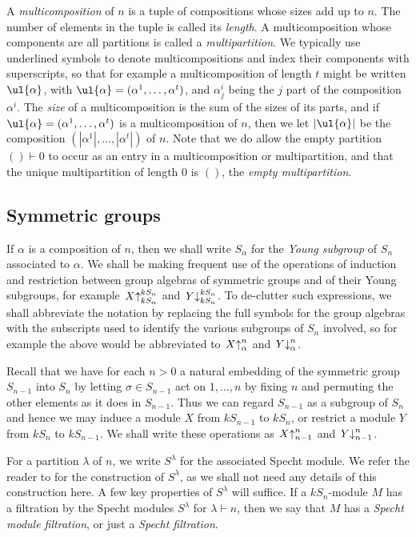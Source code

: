 A \textit{multicomposition} of $n$ is a tuple of compositions whose sizes add up to $n$. The number of elements in the tuple is called
its \textit{length}. A multicomposition whose components are all partitions is called a \textit{multipartition}. We typically use
underlined symbols to denote multicompositions and index their components with superscripts, so that for example a multicomposition of
length $t$ might be written $\ul{\alpha}$, with $\ul{\alpha} = (\alpha^1,\ldots,\alpha^t)$, and $\alpha^i_j$ being the $j$ part
of the composition $\alpha^i$. The \textit{size} of a multicomposition is the sum of the sizes of its parts, and if
$\ul{\alpha} = (\alpha^1,\ldots,\alpha^t)$ is a multicomposition of $n$, then we let $|\ul{\alpha}|$ be the composition
$(|\alpha^1|,\ldots,|\alpha^t|)$ of $n$. Note that we do allow the empty partition $() \vdash 0$ to occur as an entry in a
multicomposition or multipartition, and that the unique multipartition of length 0 is $()$, the \textit{empty multipartition}.

\subsection{Symmetric groups}
If $\alpha$ is a composition of $n$, then we shall write $S_\alpha$ for the \textit{Young subgroup} of $S_n$ associated to $\alpha$.
We shall be making frequent use of the operations of induction and restriction between group algebras of symmetric groups and of their
Young subgroups, for example
$\left.X\right\uparrow^{kS_n}_{kS_\alpha}$ and $\left.Y\right\downarrow^{kS_n}_{kS_\alpha}$.
To de-clutter such expressions, we shall abbreviate the notation by replacing the full symbols for the group algebras with the subscripts
used to identify the various subgroups of $S_n$ involved, so for example the above would be abbreviated to
$\left.X\right\uparrow^{n}_{\alpha}$ and $\left.Y\right\downarrow^{n}_{\alpha}$.

Recall that we have for each $n > 0$ a natural embedding of the symmetric group $S_{n-1}$ into $S_n$ by letting
$\sigma \in S_{n-1}$ act on ${1,\ldots,n}$ by fixing $n$ and permuting the other elements as it does in $S_{n-1}$. Thus we can regard
$S_{n-1}$ as a subgroup of $S_n$ and hence we may induce a module $X$ from $kS_{n-1}$ to $kS_n$, or restrict a module $Y$ from $kS_n$ to
$kS_{n-1}$. We shall write these operations as
$\left.X\right\uparrow^{n}_{n-1}$  and $\left.Y\right\downarrow^{n}_{n-1}$.

For a partition $\lambda$ of $n$, we write $S^\lambda$ for the associated Specht module. We refer the reader to \cite[Ch. 4]{JAMSN} for
the construction of $S^\lambda$, as we shall not need any details of this construction here. A few key properties of $S^\lambda$ will
suffice. If a $kS_n$-module $M$ has a filtration by the Specht modules $S^\lambda$ for $\lambda \vdash n$, then we say that $M$ has a
\textit{Specht module filtration}, or just a \textit{Specht filtration}.

